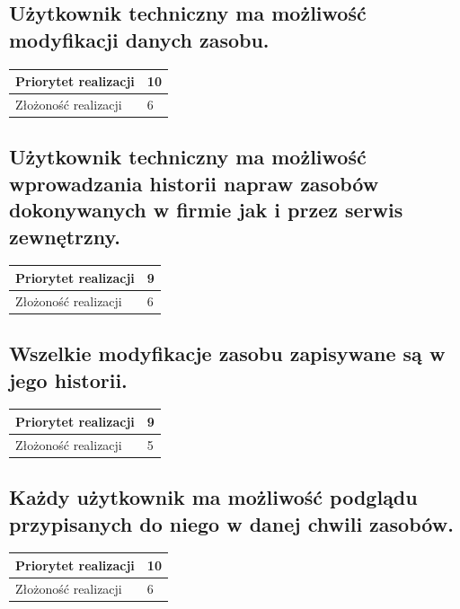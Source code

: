 \documentclass[11pt, a4paper, oneside]{report}
\begin{document}
\subsection{Użytkownik techniczny ma możliwość modyfikacji danych zasobu.}
\begin{center}
\begin{tabular}[c]{| l | l | }
  \hline			
  Priorytet realizacji & 10 \\
  \hline
  Złożoność realizacji & 6 \\
  \hline  
\end{tabular}
\end{center}
\subsection{Użytkownik techniczny ma możliwość wprowadzania historii napraw zasobów dokonywanych w firmie jak i przez serwis zewnętrzny.}
\begin{center}
\begin{tabular}[c]{| l | l | }
  \hline			
  Priorytet realizacji & 9 \\
  \hline
  Złożoność realizacji & 6 \\
  \hline  
\end{tabular}
\end{center}
\subsection{Wszelkie modyfikacje zasobu zapisywane są w jego historii. }
\begin{center}
\begin{tabular}[c]{| l | l | }
  \hline			
  Priorytet realizacji & 9 \\
  \hline
  Złożoność realizacji & 5 \\
  \hline  
\end{tabular}
\end{center}
\subsection{Każdy użytkownik ma możliwość podglądu przypisanych do niego w danej chwili zasobów.}
\begin{center}
\begin{tabular}[c]{| l | l | }
  \hline			
  Priorytet realizacji & 10 \\
  \hline
  Złożoność realizacji & 6 \\
  \hline  
\end{tabular}
\end{center}
\end{document}
